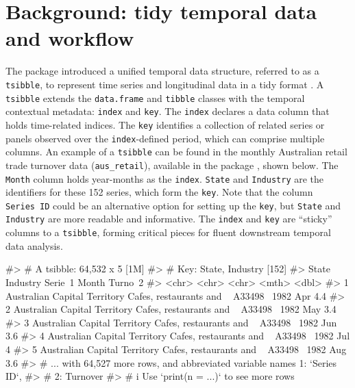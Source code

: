 \hypertarget{background-tidy-temporal-data-and-workflow}{%
\section{Background: tidy temporal data and
workflow}\label{background-tidy-temporal-data-and-workflow}}

The  package \citep{wang2020tsibble} introduced a
unified temporal data structure, referred to as a \texttt{tsibble}, to
represent time series and longitudinal data in a tidy format
\citep{wickham2014tidy}. A \texttt{tsibble} extends the
\texttt{data.frame} and \texttt{tibble} classes with the temporal
contextual metadata: \texttt{index} and \texttt{key}. The \texttt{index}
declares a data column that holds time-related indices. The \texttt{key}
identifies a collection of related series or panels observed over the
\texttt{index}-defined period, which can comprise multiple columns. An
example of a \texttt{tsibble} can be found in the monthly Australian
retail trade turnover data (\texttt{aus\_retail}), available in the
 package \citep{R-tsibbledata}, shown below. The
\texttt{Month} column holds year-months as the \texttt{index}.
\texttt{State} and \texttt{Industry} are the identifiers for these 152
series, which form the \texttt{key}. Note that the column
\texttt{Series\ ID} could be an alternative option for setting up the
\texttt{key}, but \texttt{State} and \texttt{Industry} are more readable
and informative. The \texttt{index} and \texttt{key} are ``sticky''
columns to a \texttt{tsibble}, forming critical pieces for fluent
downstream temporal data analysis.

\begin{Schunk}
\begin{Soutput}
#> # A tsibble: 64,532 x 5 [1M]
#> # Key:       State, Industry [152]
#>   State                        Industry                 Serie~1    Month Turno~2
#>   <chr>                        <chr>                    <chr>      <mth>   <dbl>
#> 1 Australian Capital Territory Cafes, restaurants and ~ A33498~ 1982 Apr     4.4
#> 2 Australian Capital Territory Cafes, restaurants and ~ A33498~ 1982 May     3.4
#> 3 Australian Capital Territory Cafes, restaurants and ~ A33498~ 1982 Jun     3.6
#> 4 Australian Capital Territory Cafes, restaurants and ~ A33498~ 1982 Jul     4  
#> 5 Australian Capital Territory Cafes, restaurants and ~ A33498~ 1982 Aug     3.6
#> # ... with 64,527 more rows, and abbreviated variable names 1: `Series ID`,
#> #   2: Turnover
#> # i Use `print(n = ...)` to see more rows
\end{Soutput}
\end{Schunk}

